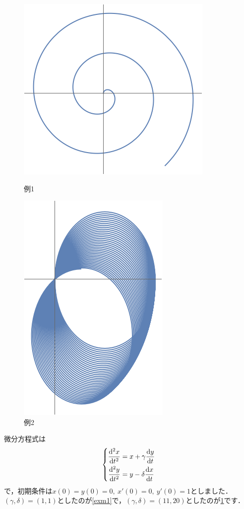 \documentclass[a4paper,pdflatex,ja=standard]{bxjsarticle}
\begin{document}
\begin{enumerate}
  \begin{figure}[ht]
    \centering
    \begin{minipage}[b]{0.45\linewidth}
      \centering
      \includegraphics[keepaspectratio, scale=0.5]{fig/01.png}
      \caption{例1}
      \label{exm1}
    \end{minipage}
    \begin{minipage}[b]{0.45\linewidth}
      \centering
      \includegraphics[keepaspectratio, scale=0.5]{fig/02.png}
      \caption{例2}
      \label{exm2}
    \end{minipage}
  \end{figure}

  微分方程式は
  \begin{equation}
    \left\{
      \begin{alignedat}{1}
        \dv[2]{x}{t}
        &=
        x
        +
        \gamma\dv{y}{t}
        \\
        \dv[2]{y}{t}
        &=
        y
        -
        \delta\dv{x}{t}
      \end{alignedat}
    \right.
  \end{equation}
  で，初期条件は$x(0)=y(0)=0,\ x'(0)=0,\ y'(0)=1$としました．$(\gamma,\delta)=(1,1)$としたのが\ref{exm1}で，$(\gamma,\delta)=(11,20)$としたのが\ref{exm2}です．

\end{enumerate}
\end{document}
